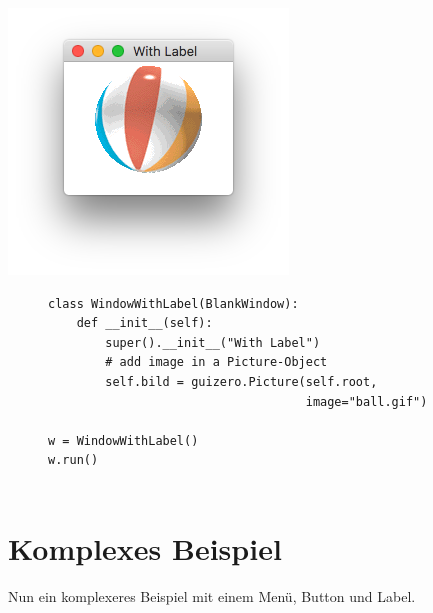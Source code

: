 \documentclass{tufte-handout}
\begin{document}
\begin{marginfigure}
	\begin{center}
		\includegraphics[width=\textwidth]{../with_label.png}
	\end{center}	
\end{marginfigure}

\begin{figure}
	\begin{lstlisting}
class WindowWithLabel(BlankWindow):
    def __init__(self):
        super().__init__("With Label")
        # add image in a Picture-Object
        self.bild = guizero.Picture(self.root,
                                    image="ball.gif")

w = WindowWithLabel()
w.run()
	
	\end{lstlisting}
\end{figure} 

\clearpage
\section{Komplexes Beispiel}

Nun ein komplexeres Beispiel mit einem Menü, Button und Label.
\end{document}

